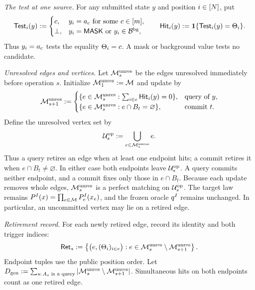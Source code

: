 \begin{definition*}
\emph{The test at one source.}
For any submitted state \(y\) and position \(i\in\PositionSet\), put
\begin{equation}
 \HardTest{y}{i}:=
 \begin{cases}
  c,&y_i=\HardCandidate{c}\text{ for some }c\in[\HardBankSize],\\
  \bot,&y_i=\MASK\text{ or }y_i\in\HardBackground,
 \end{cases}
 \qquad
 \HardHit{y}{i}:=
 \mathbf 1\{\HardTest{y}{i}=\TriggerIndex{i}\}.
 \label{app:eq:hard-test-and-hit}
\end{equation}
Thus \(y_i=\HardCandidate{c}\) tests the equality
\(\TriggerIndex{i}=c\). A mask or background value tests no candidate.

\emph{Unresolved edges and vertices.}
Let \(\OpUnresolvedMatching{s}\) be the edges unresolved immediately
before operation \(s\). Initialize \(\OpUnresolvedMatching{1}:=\HiddenMatching\)
and update by
\begin{equation}
 \OpUnresolvedMatching{s+1}:=
 \begin{cases}
  \{e\in\OpUnresolvedMatching{s}:
       \sum_{i\in e}\HardHit{y}{i}=0\},
       &\text{query of }y,\\
  \{e\in\OpUnresolvedMatching{s}:e\cap B_t=\varnothing\},
       &\text{commit }t.
 \end{cases}
 \label{app:eq:unresolved-matching-update}
\end{equation}
Define the unresolved vertex set by
\begin{equation}
 \OpUnresolvedVertices{s}:=\bigcup_{e\in\OpUnresolvedMatching{s}}e.
 \label{app:eq:unresolved-vertices}
\end{equation}
Thus a query retires an edge when at least one endpoint hits; a commit
retires it when \(e\cap B_t\ne\varnothing\). In either case both endpoints
leave \(\OpUnresolvedVertices{s}\). A query commits neither endpoint,
and a commit fixes only those in \(e\cap B_t\).
Because each update removes whole edges, \(\OpUnresolvedMatching{s}\)
is a perfect matching on \(\OpUnresolvedVertices{s}\).
The target law remains
\(\HardTargetLaw{I}(x)=\prod_{e\in\HiddenMatching}\HardEdgeLaw{e}{I}(x_e)\),
and the frozen oracle \(\HardOracle{I}\) remains unchanged.
In particular, an uncommitted vertex may lie on a retired edge.

\emph{Retirement record.}
For each newly retired edge, record its identity and both trigger indices:
\begin{equation}
 \OpRetiredRecord{s}:=
 \left\{\bigl(e,(\TriggerIndex{i})_{i\in e}\bigr):
 e\in\OpUnresolvedMatching{s}\setminus\OpUnresolvedMatching{s+1}\right\}.
 \label{app:eq:retirement-record}
\end{equation}
Endpoint tuples use the public position order. Let
\(\GenieDeletions:=\sum_{s:\,A_s\text{ is a query}}
 |\OpUnresolvedMatching{s}\setminus\OpUnresolvedMatching{s+1}|\).
Simultaneous hits on both endpoints count as one retired edge.


\end{definition*}
